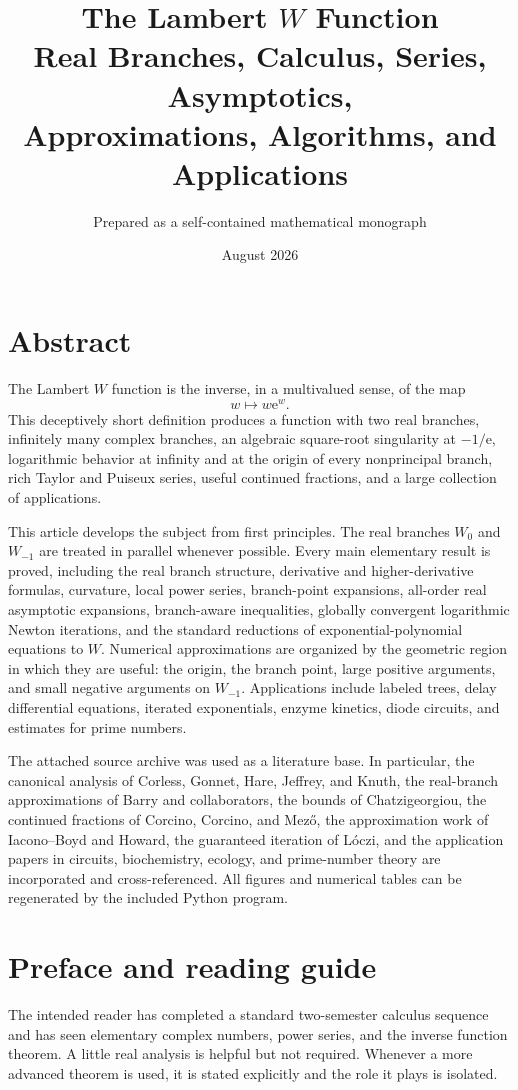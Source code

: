 \documentclass[11pt,openany]{book}
\title{\Huge The Lambert \(W\) Function\\[0.4em]
\Large Real Branches, Calculus, Series, Asymptotics,\\
Approximations, Algorithms, and Applications}
\author{Prepared as a self-contained mathematical monograph}
\date{August 2026}
\newcommand{\e}{\mathrm{e}}
\newcommand{\Wzero}{W_0}
\newcommand{\Wmone}{W_{-1}}
\theoremstyle{plain}
\theoremstyle{definition}
\theoremstyle{remark}
\begin{document}
\frontmatter
\maketitle

\chapter*{Abstract}
The Lambert \(W\) function is the inverse, in a multivalued sense, of the map
\[
    w\longmapsto w\e^w.
\]
This deceptively short definition produces a function with two real branches,
infinitely many complex branches, an algebraic square-root singularity at
\(-1/\e\), logarithmic behavior at infinity and at the origin of every
nonprincipal branch, rich Taylor and Puiseux series, useful continued fractions,
and a large collection of applications.

This article develops the subject from first principles.  The real branches
\(\Wzero\) and \(\Wmone\) are treated in parallel whenever possible.  Every
main elementary result is proved, including the real branch structure,
derivative and higher-derivative formulas, curvature, local power series,
branch-point expansions, all-order real asymptotic expansions, branch-aware
inequalities, globally convergent logarithmic Newton iterations, and the
standard reductions of exponential-polynomial equations to \(W\).  Numerical
approximations are organized by the geometric region in which they are useful:
the origin, the branch point, large positive arguments, and small negative
arguments on \(W_{-1}\).  Applications include labeled trees, delay differential
equations, iterated exponentials, enzyme kinetics, diode circuits, and estimates
for prime numbers.

The attached source archive was used as a literature base.  In particular, the
canonical analysis of Corless, Gonnet, Hare, Jeffrey, and Knuth, the real-branch
approximations of Barry and collaborators, the bounds of Chatzigeorgiou, the
continued fractions of Corcino, Corcino, and Mez\H{o}, the approximation work of
Iacono--Boyd and Howard, the guaranteed iteration of L\'{o}czi, and the
application papers in circuits, biochemistry, ecology, and prime-number theory
are incorporated and cross-referenced.  All figures and numerical tables can be
regenerated by the included Python program.

\chapter*{Preface and reading guide}
The intended reader has completed a standard two-semester calculus sequence and
has seen elementary complex numbers, power series, and the inverse function
theorem.  A little real analysis is helpful but not required.  Whenever a more
advanced theorem is used, it is stated explicitly and the role it plays is
isolated.
\end{document}

